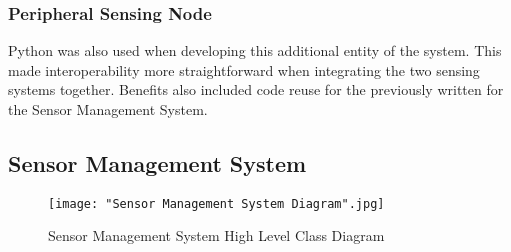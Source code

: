 \documentclass{article}
\begin{document}
\subsubsection{Peripheral Sensing Node}
Python was also used when developing this additional entity of the system. This made interoperability more straightforward when integrating the two sensing systems together. Benefits also included code reuse for the previously written for the Sensor Management System. 

\subsection{Sensor Management System}

\begin{figure}[H]
\centering
\texttt{[image: "Sensor Management System Diagram".jpg]}
\caption{Sensor Management System High Level Class Diagram\label{overflow}}
\label{fig:sms_high_level_arch}
\end{figure}
\end{document}
